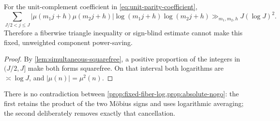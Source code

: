 \begin{proposition}
\label{prop:absolute-nogo}
For the unit-complement coefficient in
\eqref{eq:unit-parity-coefficient},
\begin{equation}
 \boxed{
 \sum_{J/2<j\le J}
 \left|\mu(m_1j+h)\mu(m_2j+h)\right|
 \log(m_1j+h)\log(m_2j+h)
 \gg_{m_1,m_2,h}J(\log J)^2.}
 \label{eq:absolute-nogo}
\end{equation}
Therefore a fiberwise triangle inequality or sign-blind estimate cannot
make this fixed, unweighted component power-saving.
\end{proposition}

\begin{proof}
By \cref{lem:simultaneous-squarefree}, a positive proportion of the
integers in \((J/2,J]\) make both forms squarefree.  On that interval
both logarithms are \(\asymp\log J\), and
\(|\mu(n)|=\mu^2(n)\).
\end{proof}

There is no contradiction between
\cref{prop:fixed-fiber-log,prop:absolute-nogo}: the first retains the
product of the two M\"obius signs and uses logarithmic averaging; the
second deliberately removes exactly that cancellation.
